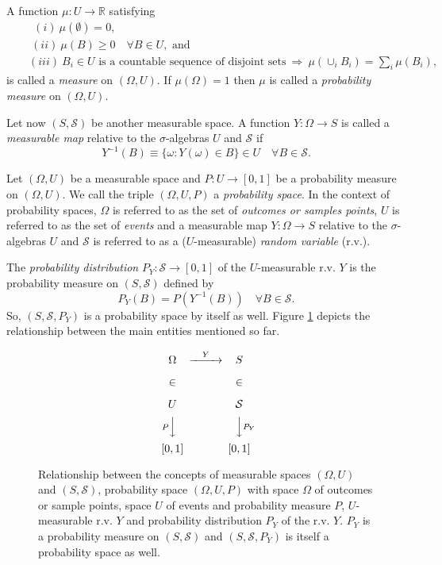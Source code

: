 A function $\mu:U\rightarrow\mathbb{R}$ satisfying
\begin{eqnarray*}
 & & ~~(i)~\mu(\emptyset) = 0, \\
 & & ~(ii)~\mu(B)\geqslant 0\quad\forall B\in U,\text{ and} \\
 & & (iii)~B_i\in U\text{ is a countable sequence of disjoint sets}~\Rightarrow~\mu(\cup_iB_i)=\sum_i \mu(B_i),
\end{eqnarray*}
is called a {\it measure} on $(\Omega,U)$. If $\mu(\Omega)=1$ then $\mu$ is called a {\it probability measure} on $(\Omega,U)$.

Let now $(S,\mathcal{S})$ be another measurable space.
A function $Y:\Omega\rightarrow S$ is called a {\it measurable map} relative to the $\sigma$-algebras $U$ and $\mathcal{S}$ if
\begin{equation*}
Y^{-1}(B)\equiv\{\omega: Y(\omega)\in B\}\in U\quad\forall B\in\mathcal{S}.
\end{equation*}

Let $(\Omega,U)$ be a measurable space and $P:U\rightarrow [0,1]$ be a probability measure on $(\Omega,U)$.
We call the triple $(\Omega,U,P)$ a {\it probability space}.
In the context of probability spaces,
$\Omega$ is referred to as the set of {\it outcomes or samples points},
$U$ is referred to as the set of {\it events} and
a measurable map $Y:\Omega\rightarrow S$ relative to the $\sigma$-algebras $U$ and $\mathcal{S}$ is referred to as a ($U$-measurable) {\it random variable} (r.v.).

The {\it probability distribution} $P_Y:\mathcal{S}\rightarrow [0,1]$ of the $U$-measurable r.v. $Y$
is the probability measure on $(S,\mathcal{S})$ defined by
\begin{equation*}
P_Y(B) = P(Y^{-1}(B))\quad\forall B\in\mathcal{S}.
\end{equation*}
So, $(S,\mathcal{S},P_Y)$ is a probability space by itself as well.
Figure \ref{fig-rv-diagram} depicts the relationship between the main entities mentioned so far.

\begin{figure}[h]
\[
\begin{CD}
\Omega   @>Y>> S           \\
\in      @.    \in         \\
U        @.    \mathcal{S} \\
@VP VV         @VVP_Y V    \\
[0,1]    @.    [0,1]
\end{CD}
\]
\caption{Relationship between the concepts of
measurable spaces $(\Omega,U)$ and $(S,\mathcal{S})$,
probability space $(\Omega,U,P)$ with
space $\Omega$ of outcomes or sample points,
space $U$ of events and
probability measure $P$,
$U$-measurable r.v. $Y$ and
probability distribution $P_Y$ of the r.v. $Y$.
$P_Y$ is a probability measure on $(S,\mathcal{S})$ and
$(S,\mathcal{S},P_Y)$ is itself a probability space as well.
}
\label{fig-rv-diagram}
\end{figure}


